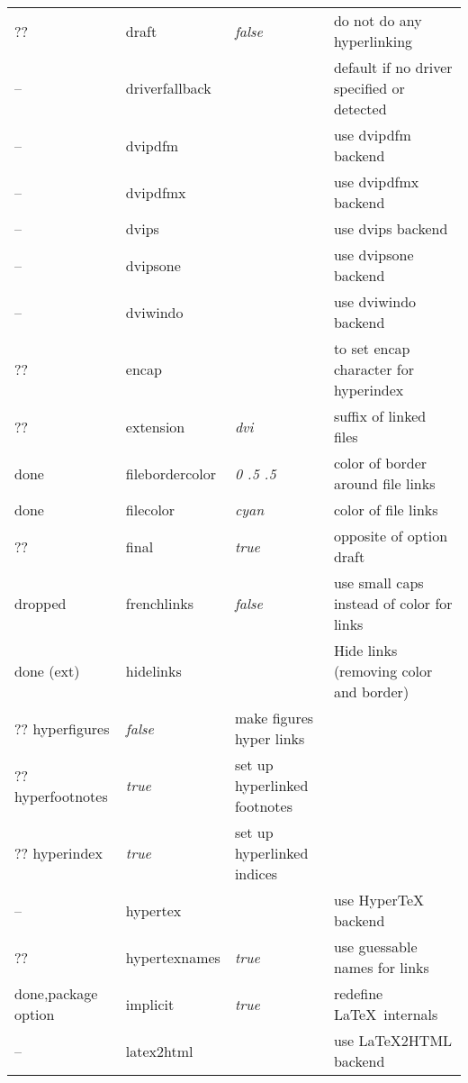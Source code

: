 \begin{longtable}{@{}l>{\ttfamily}llp{7cm}@{}}
??   & draft              & \textit{false}         & do not do any hyperlinking \\
--   & driverfallback     &                        & default if no driver specified or detected\\
--   & dvipdfm            &                        & use \textsf{dvipdfm} backend \\
--   & dvipdfmx           &                        & use \textsf{dvipdfmx} backend \\
--   & dvips              &                        & use \textsf{dvips} backend \\
--   & dvipsone           &                        & use \textsf{dvipsone} backend \\
--   & dviwindo           &                        & use \textsf{dviwindo} backend \\
??   &encap              &                        & to set encap character for hyperindex \\
??   &extension          & \textit{dvi}           & suffix of linked files \\
done &filebordercolor    & \textit{0 .5 .5}       & color of border around file links \\
done &filecolor          & \textit{cyan}          & color of file links \\
??   &final              & \textit{true}          & opposite of option draft \\
dropped &frenchlinks        & \textit{false}         & use small caps instead of color for links \\
done (ext) & hidelinks          &                        & Hide links (removing color and border) \\
?? hyperfigures       & \textit{false}         & make figures hyper links \\
?? hyperfootnotes     & \textit{true}          & set up hyperlinked footnotes \\
?? hyperindex         & \textit{true}          & set up hyperlinked indices \\
-- & hypertex           &                        & use \textsf{Hyper\TeX} backend \\
?? & hypertexnames      & \textit{true}          & use guessable names for links \\
done,package option & implicit           & \textit{true}          & redefine \LaTeX\ internals \\
-- & latex2html         &                        & use \textsf{\LaTeX2HTML} backend \\

\end{longtable}
